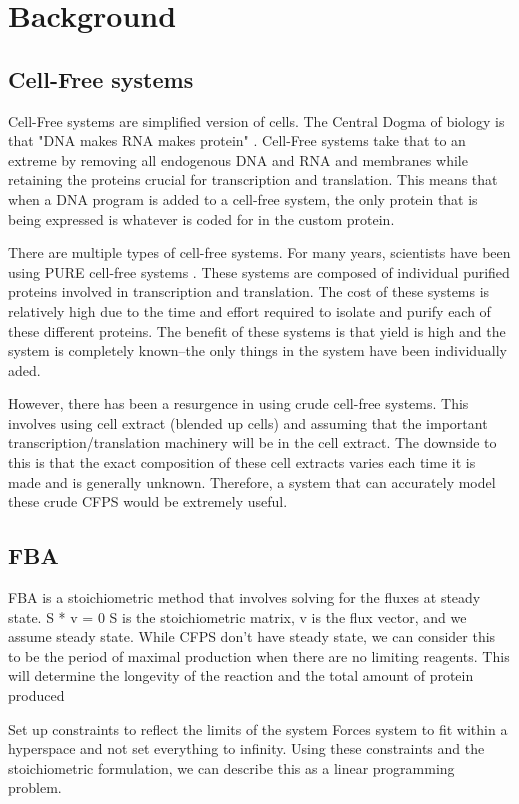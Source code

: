 \chapter{Background}

\section{Cell-Free systems}
Cell-Free systems are simplified version of cells.
The Central Dogma of biology is that "DNA makes RNA makes protein" \cite{}.
Cell-Free systems take that to an extreme by removing all endogenous DNA and RNA and membranes while retaining the proteins crucial for transcription and translation.
This means that when a DNA program is added to a cell-free system, the only protein that is being expressed is whatever is coded for in the custom protein.

There are multiple types of cell-free systems.
For many years, scientists have been using PURE cell-free systems \cite{}.
These systems are composed of individual purified proteins involved in transcription and translation.
The cost of these systems is relatively high due to the time and effort required to isolate and purify each of these different proteins.
The benefit of these systems is that yield is high and the system is completely known--the only things in the system have been individually aded.

However, there has been a resurgence in using crude cell-free systems.
This involves using cell extract (blended up cells) and assuming that the important transcription/translation machinery will be in the cell extract.
The downside to this is that the exact composition of these cell extracts varies each time it is made and is generally unknown.
Therefore, a system that can accurately model these crude CFPS would be extremely useful.

\section{FBA}
FBA is a stoichiometric method that involves solving for the fluxes at steady state.
S * v = 0
S is the stoichiometric matrix, v is the flux vector, and we assume steady state.
While CFPS don't have steady state, we can consider this to be the period of maximal production when there are no limiting reagents.
This will determine the longevity of the reaction and the total amount of protein produced

Set up constraints to reflect the limits of the system
Forces system to fit within a hyperspace and not set everything to infinity.
Using these constraints and the stoichiometric formulation, we can describe this as a linear programming problem.

